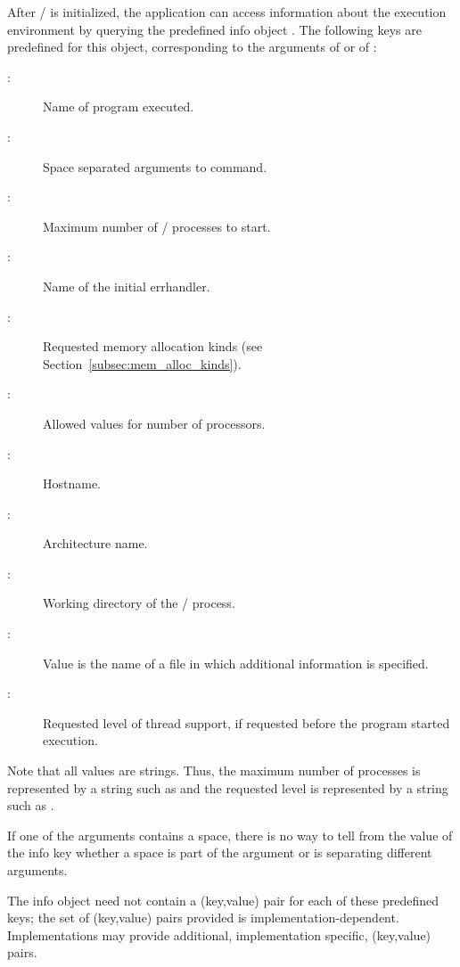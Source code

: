 After \MPI/ is initialized, the application can access information
about the execution environment by querying the predefined info object
.
The following keys are predefined for this object, corresponding to the
arguments of  or of :
\begin{description}
\item[:] Name of program executed.
\item[:] Space separated arguments to command.
\item[:] Maximum number of \MPI/ processes
  to start.
\item[:] Name of the initial errhandler.
\item[:] Requested memory allocation kinds
    (see Section~\ref{subsec:mem_alloc_kinds}).
\item[:] Allowed values for number of processors.

\item[:] Hostname.
\item[:] Architecture name.
\item[:] Working directory of the
\MPI/ process.
\item[:] Value is the name of a file in which additional information
is specified.
\item[:] Requested level of thread support, if
  requested before the program started execution.
\end{description}

Note that all values are strings. Thus, the maximum number of
processes is represented by a string such as  and
the requested level is represented by a string such
as .

\begin{users}
  If one of the  arguments contains a space, there is no way to
  tell from the value of the  info key whether a space is part
  of the argument or is separating different arguments.
\end{users}

The info object  need not contain a (key,value)
pair for each of these predefined keys; the set of (key,value) pairs
provided is implementation-dependent.
Implementations may provide additional, implementation specific,
(key,value) pairs.

